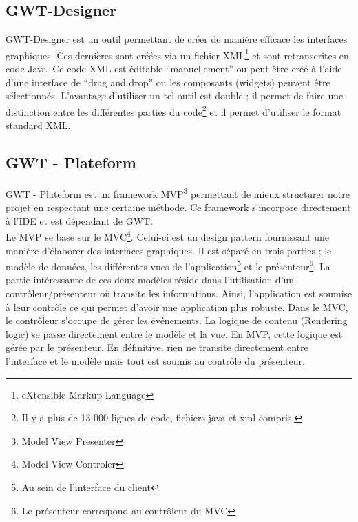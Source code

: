 \subsection{GWT-Designer}
GWT-Designer est un outil permettant de créer de manière efficace les interfaces graphiques. Ces dernières sont créées via un fichier XML\footnote{eXtensible Markup Language} et sont retranscrites en code Java. 
\newline
\indent
Ce code XML est éditable \enquote{manuellement} ou peut être créé à l'aide d'une interface de \enquote{drag and drop} ou les composants (widgets) peuvent être sélectionnés.
\newline
\indent
L'avantage d'utiliser un tel outil est double ; il permet de faire une distinction entre les différentes parties du code\footnote{Il y a plus de 13 000 lignes de code, fichiers java et xml compris.} et il permet d'utiliser le format standard XML.

\subsection{GWT - Plateform}
GWT - Plateform est un framework MVP\footnote{Model View Presenter} permettant de mieux structurer notre projet en respectant une certaine méthode. Ce framework s'incorpore directement à l'IDE et est dépendant de GWT.\\
\newline
\indent
Le MVP se base sur le MVC\footnote{Model View Controler}. Celui-ci est un design pattern fournissant une manière d'élaborer des interfaces graphiques. Il est séparé en trois parties ; le modèle de données, les différentes vues de l'application\footnote{Au sein de l'interface du client} et le présenteur\footnote{Le présenteur correspond au contrôleur du MVC}. 
\newline
\indent
La partie intéressante de ces deux modèles réside dans l'utilisation d'un contrôleur/présenteur où transite les informations. Ainsi, l'application est soumise à leur contrôle ce qui permet d'avoir une application plus robuste. 
Dans le MVC, le contrôleur s'occupe de gérer les événements. La logique de contenu (Rendering logic) se passe directement entre le modèle et la vue. 
En MVP, cette logique est gérée par le présenteur. En définitive, rien ne transite directement entre l'interface et le modèle mais tout est soumis au contrôle du présenteur.

